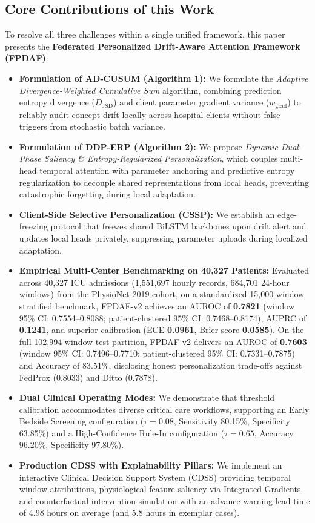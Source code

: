 \documentclass[final,5p,times,twocolumn]{elsarticle}
\begin{document}
\subsection{Core Contributions of this Work}
To resolve all three challenges within a single unified framework, this paper presents the \textbf{Federated Personalized Drift-Aware Attention Framework (FPDAF)}:
\begin{itemize}
    \item \textbf{Formulation of AD-CUSUM (Algorithm 1):} We formulate the \textit{Adaptive Divergence-Weighted Cumulative Sum} algorithm, combining prediction entropy divergence ($D_{\text{JSD}}$) and client parameter gradient variance ($w_{\text{grad}}$) to reliably audit concept drift locally across hospital clients without false triggers from stochastic batch variance.
    \item \textbf{Formulation of DDP-ERP (Algorithm 2):} We propose \textit{Dynamic Dual-Phase Saliency \& Entropy-Regularized Personalization}, which couples multi-head temporal attention with parameter anchoring and predictive entropy regularization to decouple shared representations from local heads, preventing catastrophic forgetting during local adaptation.
    \item \textbf{Client-Side Selective Personalization (CSSP):} We establish an edge-freezing protocol that freezes shared BiLSTM backbones upon drift alert and updates local heads privately, suppressing parameter uploads during localized adaptation.
    \item \textbf{Empirical Multi-Center Benchmarking on 40,327 Patients:} Evaluated across 40,327 ICU admissions (1,551,697 hourly records, 684,701 24-hour windows) from the PhysioNet 2019 cohort, on a standardized 15,000-window stratified benchmark, FPDAF-v2 achieves an AUROC of \textbf{0.7821} (window 95\% CI: 0.7554--0.8088; patient-clustered 95\% CI: 0.7468--0.8174), AUPRC of \textbf{0.1241}, and superior calibration (ECE \textbf{0.0961}, Brier score \textbf{0.0585}). On the full 102,994-window test partition, FPDAF-v2 delivers an AUROC of \textbf{0.7603} (window 95\% CI: 0.7496--0.7710; patient-clustered 95\% CI: 0.7331--0.7875) and Accuracy of 83.51\%, disclosing honest personalization trade-offs against FedProx (0.8033) and Ditto (0.7878).
    \item \textbf{Dual Clinical Operating Modes:} We demonstrate that threshold calibration accommodates diverse critical care workflows, supporting an Early Bedside Screening configuration ($\tau=0.08$, Sensitivity 80.15\%, Specificity 63.85\%) and a High-Confidence Rule-In configuration ($\tau=0.65$, Accuracy 96.20\%, Specificity 97.80\%).
    \item \textbf{Production CDSS with Explainability Pillars:} We implement an interactive Clinical Decision Support System (CDSS) providing temporal window attributions, physiological feature saliency via Integrated Gradients, and counterfactual intervention simulation with an advance warning lead time of 4.98 hours on average (and 5.8 hours in exemplar cases).
\end{itemize}
\end{document}
